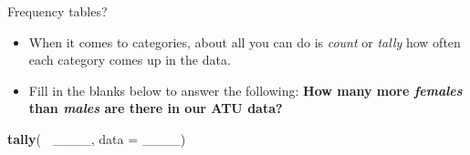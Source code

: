 \documentclass[
  ignorenonframetext,
]{beamer}
\newenvironment{Shaded}{\begin{snugshade}}{\end{snugshade}}
\newcommand{\DataTypeTok}[1]{\textcolor[rgb]{0.13,0.29,0.53}{#1}}
\newcommand{\KeywordTok}[1]{\textcolor[rgb]{0.13,0.29,0.53}{\textbf{#1}}}
\newcommand{\NormalTok}[1]{#1}
\newcommand{\OperatorTok}[1]{\textcolor[rgb]{0.81,0.36,0.00}{\textbf{#1}}}
\newcommand{\StringTok}[1]{\textcolor[rgb]{0.31,0.60,0.02}{#1}}
\providecommand{\tightlist}{%
  \setlength{\itemsep}{0pt}\setlength{\parskip}{0pt}}
\begin{document}
\begin{frame}[fragile]{Frequency tables?}
\protect\hypertarget{frequency-tables}{}

\begin{itemize}
\tightlist
\item
  When it comes to categories, about all you can do is \emph{count} or
  \emph{tally} how often each category comes up in the data.
\item
  Fill in the blanks below to answer the following: \textbf{How many
  more \emph{females} than \emph{males} are there in our ATU data?}
\end{itemize}

\begin{Shaded}
\begin{Highlighting}[]
\KeywordTok{tally}\NormalTok{(}\OperatorTok{~}\StringTok{ }\NormalTok{____, }\DataTypeTok{data =}\NormalTok{ ____)}
\end{Highlighting}
\end{Shaded}

\end{frame}
\end{document}
